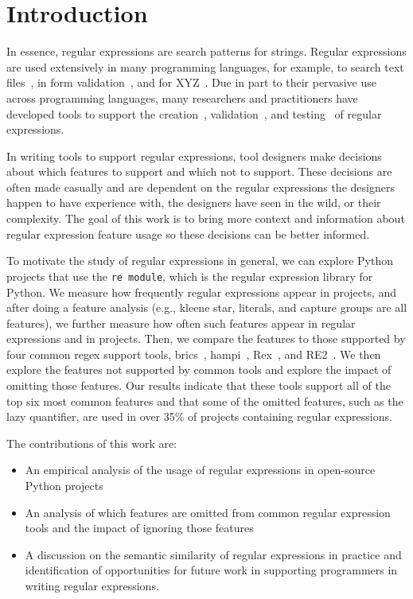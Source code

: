 \section{Introduction}

 In essence, regular expressions are search patterns for strings. Regular expressions are used extensively in many programming languages, for example, to search text files~\cite{Clarke:1997:URE:256167.256174}, in form validation~\cite{}, and for XYZ~\cite{}. Due in part to their pervasive use across programming languages, many researchers and practitioners have developed tools to support the creation~\cite{}, validation~\cite{}, and testing~\cite{} of regular expressions.

 In writing tools to support regular expressions, tool designers make decisions about which features to support and which not to support. These decisions are often made casually and are dependent on the regular expressions the designers happen to have experience with, the designers have seen in the wild, or their complexity. The goal of this work is to bring more context and information about regular expression feature usage so these decisions can be better informed.

To motivate the study of regular expressions in general, we can explore Python projects that use the {\tt re module}, which is the regular expression library for Python. We measure how frequently regular expressions appear in projects, and after doing a feature analysis (e.g., kleene star, literals, and capture groups are all features), we further measure how often such features appear in regular expressions and in projects. Then, we compare the features to those supported by four common regex support tools, brics~\cite{brics}, hampi~\cite{hampi}, Rex~\cite{}, and RE2~\cite{}. We then explore the features not supported by common tools and explore the impact of omitting those features. Our results indicate that these tools support all of the top six most common features and that some of the omitted features, such as the lazy quantifier, are used in over 35\% of projects containing regular expressions.

The contributions of this work are:

\begin{itemize}
	\item An empirical analysis of the usage of regular expressions in  open-source Python projects
	\item An analysis of which features are omitted from common regular expression tools and the impact of ignoring those features
	\item A discussion on the semantic similarity of regular expressions in practice and identification of opportunities for future work in supporting programmers in writing regular expressions.
\end{itemize}


